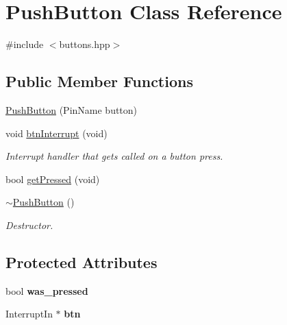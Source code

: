 \hypertarget{classPushButton}{}\section{Push\+Button Class Reference}
\label{classPushButton}


{\ttfamily \#include $<$buttons.\+hpp$>$}

\subsection*{Public Member Functions}
\begin{DoxyCompactItemize}
\item 
\hyperlink{classPushButton_a1635369b8e71436a0b1238c6c751972a}{Push\+Button} (Pin\+Name button)
\item 
\mbox{\label{classPushButton_ae1bce4edf2a02c4e0c8214b759a7949c}} 
void \hyperlink{classPushButton_ae1bce4edf2a02c4e0c8214b759a7949c}{btn\+Interrupt} (void)
\begin{DoxyCompactList}\small\item\em Interrupt handler that gets called on a button press. \end{DoxyCompactList}\item 
bool \hyperlink{classPushButton_af56d1fde8fcbb9e1c4cfceb56be5b467}{get\+Pressed} (void)
\item 
\mbox{\label{classPushButton_a3aafdb682ce6d00513583e3983f3ed44}} 
\hyperlink{classPushButton_a3aafdb682ce6d00513583e3983f3ed44}{$\sim$\+Push\+Button} ()
\begin{DoxyCompactList}\small\item\em Destructor. \end{DoxyCompactList}\end{DoxyCompactItemize}
\subsection*{Protected Attributes}
\begin{DoxyCompactItemize}
\item 
\mbox{\label{classPushButton_a9b612743b8a4c85ba9dc99808507a053}} 
bool {\bfseries was\+\_\+pressed}
\item 
\mbox{\label{classPushButton_a744bc19b3b7f510f83ba92999a0b408e}} 
Interrupt\+In $\ast$ {\bfseries btn}
\end{DoxyCompactItemize}


